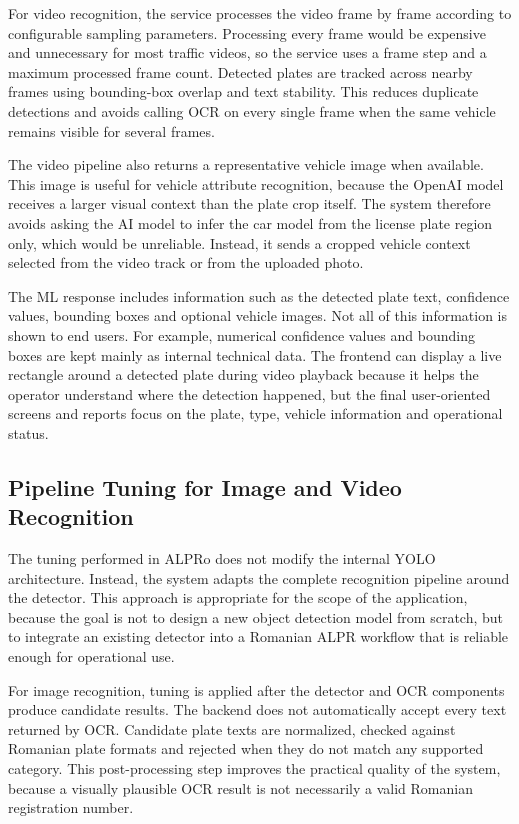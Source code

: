 ﻿\documentclass[12pt,a4paper]{article}
\begin{document}
For video recognition, the service processes the video frame by frame according to configurable sampling parameters. Processing every frame would be expensive and unnecessary for most traffic videos, so the service uses a frame step and a maximum processed frame count. Detected plates are tracked across nearby frames using bounding-box overlap and text stability. This reduces duplicate detections and avoids calling OCR on every single frame when the same vehicle remains visible for several frames.

The video pipeline also returns a representative vehicle image when available. This image is useful for vehicle attribute recognition, because the OpenAI model receives a larger visual context than the plate crop itself. The system therefore avoids asking the AI model to infer the car model from the license plate region only, which would be unreliable. Instead, it sends a cropped vehicle context selected from the video track or from the uploaded photo.

The ML response includes information such as the detected plate text, confidence values, bounding boxes and optional vehicle images. Not all of this information is shown to end users. For example, numerical confidence values and bounding boxes are kept mainly as internal technical data. The frontend can display a live rectangle around a detected plate during video playback because it helps the operator understand where the detection happened, but the final user-oriented screens and reports focus on the plate, type, vehicle information and operational status.

\subsection{Pipeline Tuning for Image and Video Recognition}

The tuning performed in ALPRo does not modify the internal YOLO architecture. Instead, the system adapts the complete recognition pipeline around the detector. This approach is appropriate for the scope of the application, because the goal is not to design a new object detection model from scratch, but to integrate an existing detector into a Romanian ALPR workflow that is reliable enough for operational use.

For image recognition, tuning is applied after the detector and OCR components produce candidate results. The backend does not automatically accept every text returned by OCR. Candidate plate texts are normalized, checked against Romanian plate formats and rejected when they do not match any supported category. This post-processing step improves the practical quality of the system, because a visually plausible OCR result is not necessarily a valid Romanian registration number.
\end{document}
